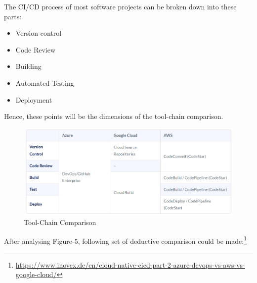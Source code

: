 The CI/CD process of most software projects can be broken down into these parts:

\begin{itemize}
    \item Version control
    \item Code Review
    \item Building
    \item Automated Testing
    \item Deployment
\end{itemize}

Hence, these points will be the dimensions of the tool-chain comparison.

\begin{figure}[h]
    \centering
    \includegraphics[width=16cm]{images/ToolChainCompare.png}
    \caption{Tool-Chain Comparison}
    \label{fig:ci-cd-pipeline-chain-compare}
\end{figure}

After analysing Figure-5, following set of deductive comparison could be made:\footnote{\url{https://www.inovex.de/en/cloud-native-cicd-part-2-azure-devops-vs-aws-vs-google-cloud/}}

